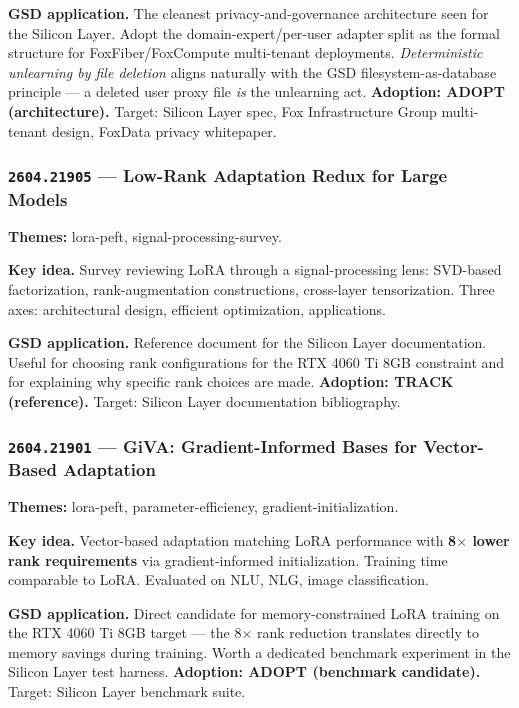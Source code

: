 \documentclass[11pt,letterpaper]{article}
\newcommand{\arxivid}[1]{\texttt{\textcolor{accent}{#1}}}
\newcommand{\paperhead}[2]{\noindent\textbf{\sffamily\textcolor{secondary}{#1}} \textemdash{} #2}
\begin{document}
\textbf{GSD application.} The cleanest privacy-and-governance architecture seen for the Silicon Layer. Adopt the domain-expert/per-user adapter split as the formal structure for FoxFiber/FoxCompute multi-tenant deployments. \textit{Deterministic unlearning by file deletion} aligns naturally with the GSD filesystem-as-database principle --- a deleted user proxy file \textit{is} the unlearning act. \textbf{Adoption: ADOPT (architecture).} Target: Silicon Layer spec, Fox Infrastructure Group multi-tenant design, FoxData privacy whitepaper.

\subsubsection{\arxivid{2604.21905} --- Low-Rank Adaptation Redux for Large Models}

\paperhead{Themes:}{lora-peft, signal-processing-survey.}

\textbf{Key idea.} Survey reviewing LoRA through a signal-processing lens: SVD-based factorization, rank-augmentation constructions, cross-layer tensorization. Three axes: architectural design, efficient optimization, applications.

\textbf{GSD application.} Reference document for the Silicon Layer documentation. Useful for choosing rank configurations for the RTX 4060 Ti 8GB constraint and for explaining why specific rank choices are made. \textbf{Adoption: TRACK (reference).} Target: Silicon Layer documentation bibliography.

\subsubsection{\arxivid{2604.21901} --- GiVA: Gradient-Informed Bases for Vector-Based Adaptation}

\paperhead{Themes:}{lora-peft, parameter-efficiency, gradient-initialization.}

\textbf{Key idea.} Vector-based adaptation matching LoRA performance with \textbf{8$\times$ lower rank requirements} via gradient-informed initialization. Training time comparable to LoRA. Evaluated on NLU, NLG, image classification.

\textbf{GSD application.} Direct candidate for memory-constrained LoRA training on the RTX 4060 Ti 8GB target --- the 8$\times$ rank reduction translates directly to memory savings during training. Worth a dedicated benchmark experiment in the Silicon Layer test harness. \textbf{Adoption: ADOPT (benchmark candidate).} Target: Silicon Layer benchmark suite.
\end{document}
